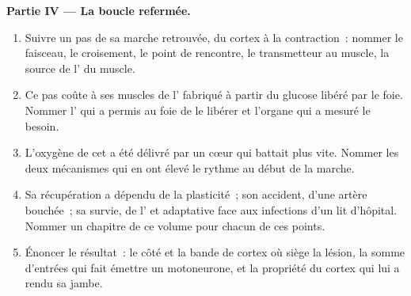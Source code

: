 \begin{problem}
\medskip
\noindent\textbf{Partie IV --- La boucle refermée.}
\begin{enumerate}[resume]
  \item Suivre un pas de sa marche retrouvée, du cortex à la
        contraction~: nommer le faisceau, le croisement, le point de
        rencontre, le transmetteur au muscle, la source de l' du
        muscle.
  \item Ce pas coûte à ses muscles de l' fabriqué à partir du
        glucose libéré par le foie. Nommer l' qui a permis au
        foie de le libérer et l'organe qui a mesuré le besoin.
  \item L'oxygène de cet  a été délivré par un cœur qui battait
        plus vite. Nommer les deux mécanismes qui en ont élevé le
        rythme au début de la marche.
  \item Sa récupération a dépendu de la plasticité~; son accident,
        d'une artère bouchée~; sa survie, de l' et
        adaptative face aux infections d'un lit d'hôpital. Nommer un
        chapitre de ce volume pour chacun de ces points.
  \item Énoncer le résultat~: le côté et la bande de cortex où siège
        la lésion, la somme d'entrées qui fait émettre un motoneurone,
        et la propriété du cortex qui lui a rendu sa jambe.
\end{enumerate}
\end{problem}
